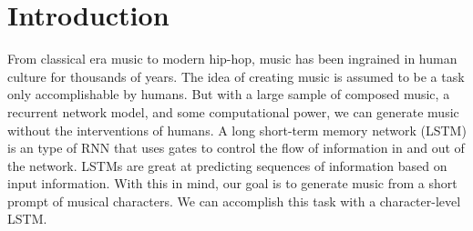 \section*{Introduction}
From classical era music to modern hip-hop, music has been ingrained in human culture for thousands of years. The idea of creating music is assumed to be a task only accomplishable by humans. But with a large sample of composed music, a recurrent network model, and some computational power, we can generate music without the interventions of humans. A long short-term memory network (LSTM) is an type of RNN that uses gates to control the flow of information in and out of the network. LSTMs are great at predicting sequences of information based on input information. With this in mind, our goal is to generate music from a short prompt of musical characters. We can accomplish this task with a character-level LSTM.